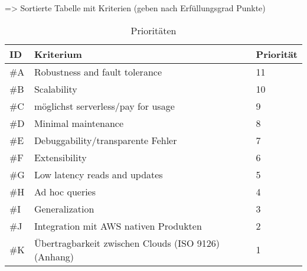 => Sortierte Tabelle mit Kriterien (geben nach Erfüllungsgrad Punkte)
\begin{table}[H]
\centering
\begin{tabular}{|l|l|l|}
\hline
ID & Kriterium & Priorität \\ \hline
\#A & Robustness and fault tolerance & 11 \\ \hline
\#B & Scalability & 10 \\ \hline
\#C & möglichst serverless/pay for usage & 9 \\ \hline
\#D & Minimal maintenance & 8 \\ \hline
\#E & Debuggability/transparente Fehler & 7 \\ \hline
\#F & Extensibility & 6 \\ \hline
\#G & Low latency reads and updates & 5 \\ \hline
\#H & Ad hoc queries & 4 \\ \hline
\#I & Generalization & 3 \\ \hline
\#J & Integration mit AWS nativen Produkten & 2 \\ \hline
\#K & Übertragbarkeit zwischen Clouds (ISO 9126) (Anhang) & 1 \\ \hline
\end{tabular}
\caption{Prioritäten}
\label{tab:prioritaeten}
\end{table}


